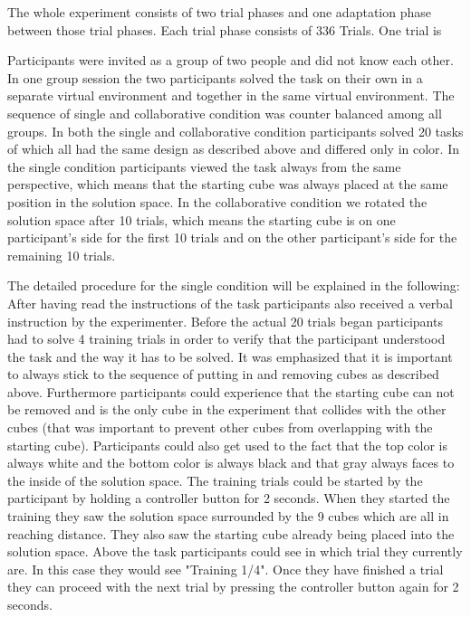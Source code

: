 The whole experiment consists of two trial phases and one adaptation phase between those trial phases. Each trial phase consists of 336 Trials. One trial is

Participants were invited as a group of two people and did not know each other. In one group session the two participants solved the task on their own in a separate virtual environment and together in the same virtual environment. The sequence of single and collaborative condition was counter balanced among all groups. In both the single and collaborative condition participants solved 20 tasks of which all had the same design as described above and differed only in color. In the single condition participants viewed the task always from the same perspective, which means that the starting cube was always placed at the same position in the solution space.
In the collaborative condition we rotated the solution space after 10 trials, which means the starting cube is on one participant's side for the first 10 trials and on the other participant's side for the remaining 10 trials. 

The detailed procedure for the single condition will be explained in the following:
After having read the instructions of the task participants also received a verbal instruction by the experimenter. Before the actual 20 trials began participants had to solve 4 training trials in order to verify that the participant understood the task and the way it has to be solved. It was emphasized that it is important to always stick to the sequence of putting in and removing cubes as described above. Furthermore participants could experience that the starting cube can not be removed and is the only cube in the experiment that collides with the other cubes (that was important to prevent other cubes from overlapping with the starting cube). Participants could also get used to the fact that the top color is always white and the bottom color is always black and that gray always faces to the inside of the solution space. The training trials could be started by the participant by holding a controller button for 2 seconds. When they started the training they saw the solution space surrounded by the 9 cubes which are all in reaching distance. They also saw the starting cube already being placed into the solution space. Above the task participants could see in which trial they currently are. In this case they would see "Training 1/4". Once they have finished a trial they can proceed with the next trial by pressing the controller button again for 2 seconds. 

